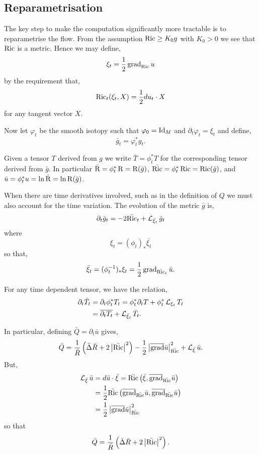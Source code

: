 \documentclass{amsart}
\begin{document}
\subsection{Reparametrisation}
\label{subsec:harnack_reparam}

The key step to make the computation significantly more tractable is to reparametrise the flow. From the assumption \(\operatorname{Ric} \geq K_0 g\) with \(K_0 > 0\) we see that \(\operatorname{Ric}\) is a metric. Hence we may define,
\[
\xi_t = \frac{1}{2} \operatorname{grad}_{\operatorname{Ric}} u
\]
by the requirement that,
\[
\operatorname{Ric}_t (\xi_t, X) = \frac{1}{2} du_t \cdot X
\]
for any tangent vector \(X\).

Now let \(\varphi_t\) be the smooth isotopy such that \(\varphi_0 = \operatorname{Id}_M\) and \(\partial_t \varphi_t = \xi_t\) and define,
\[
\bar{g}_t = \varphi_t^{\ast} g_t.
\]

Given a tensor \(T\) derived from \(g\) we write \(\bar{T} = \phi_t^{\ast} T\) for the corresponding tensor derived from \(\bar{g}\). In particular \(\bar{\operatorname{R}} = \phi_t^{\ast} \operatorname{R} = \operatorname{R}(\bar{g})\), \(\bar{\operatorname{Ric}} = \phi_t^{\ast} \operatorname{Ric} = \operatorname{Ric}(\bar{g})\), and \(\bar{u} = \phi_t^{\ast} u = \ln \bar{\operatorname{R}} = \ln \operatorname{R}(\bar{g})\).

When there are time derivatives involved, such as in the definition of \(Q\) we must also account for the time variation. The evolution of the metric \(\bar{g}\) is,
\begin{equation}
\label{eq:rf_reparam}
\partial_t \bar{g}_t = - 2\bar{\operatorname{Ric}}_t + \operatorname{\mathcal{L}}_{\bar{\xi}_t} \bar{g}_t
\end{equation}
where
\[
\xi_t = (\phi_t)_{\ast} \bar{\xi_t}
\]
so that,
\[
\bar{\xi}_t = (\phi_t^{-1})_{\ast} \xi_t = \frac{1}{2} \operatorname{grad}_{\bar{\operatorname{Ric}}_t} \bar{u}.
\]

For any time dependent tensor, we have the relation,
\begin{equation}
\label{eq:dt_reparam}
\begin{split}
\partial_t \bar{T}_t &= \partial_t \phi_t^{\ast} T_t = \phi_t^{\ast} \partial_t T + \phi_t^{\ast} \operatorname{\mathcal{L}}_{\xi_t} T_t \\
&= \overline{\partial_t T_t} + \operatorname{\mathcal{L}}_{\bar{\xi}_t} \bar{T}_t.
\end{split}
\end{equation}

In particular, defining \(\bar{Q} = \partial_t \bar{u}\) gives,
\[
\bar{Q} = \frac{1}{\bar{R}} \left(\bar{\Delta} \bar{R} + 2 \left|{\bar{\operatorname{Ric}}}\right|^2\right) - \frac{1}{2} \left|{\overline{\operatorname{grad}} \bar{u}}\right|_{\bar{\operatorname{Ric}}}^2 + \operatorname{\mathcal{L}}_{\bar{\xi}} \bar{u}.
\]
But,
\[
\begin{split}
\operatorname{\mathcal{L}}_{\bar{\xi}} \bar{u} &= d\bar{u} \cdot \bar{\xi} = \bar{\operatorname{Ric}} \left(\bar{\xi}, \overline{\operatorname{grad}}_{\bar{\operatorname{Ric}}} \bar{u}\right) \\
&= \frac{1}{2} \bar{\operatorname{Ric}} \left(\overline{\operatorname{grad}}_{\bar{\operatorname{Ric}}} \bar{u}, \overline{\operatorname{grad}}_{\bar{\operatorname{Ric}}} \bar{u}\right) \\
&= \frac{1}{2} \left|{\overline{\operatorname{grad}} \bar{u}}\right|_{\bar{\operatorname{Ric}}}^2
\end{split}
\]
so that
\begin{equation}
\label{eq:harnack_Q_reparm}
\bar{Q} = \frac{1}{\bar{R}} \left(\bar{\Delta} \bar{R} + 2 \left|{\bar{\operatorname{Ric}}}\right|^2\right).
\end{equation}
\end{document}
